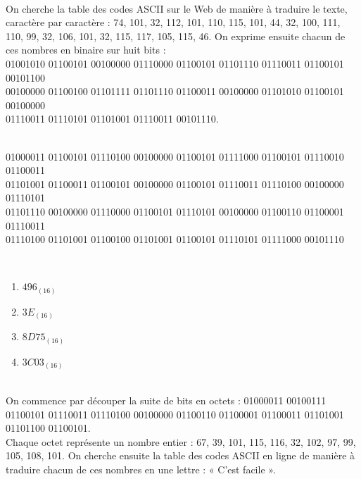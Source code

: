 \begin{Soln}{1}
		~\\
On cherche la table des codes ASCII sur le Web de manière à traduire le texte, caractère par
caractère : 74, 101, 32, 112, 101, 110, 115, 101, 44, 32, 100, 111, 110, 99, 32, 106, 101, 32,
115, 117, 105, 115, 46. On exprime ensuite chacun de ces nombres en binaire sur huit bits :\\
01001010 01100101 00100000 01110000 01100101 01101110 01110011 01100101 00101100\\
00100000 01100100 01101111 01101110 01100011 00100000 01101010 01100101 00100000\\
01110011 01110101 01101001 01110011 00101110.\\

	
\end{Soln}
\begin{Soln}{2}
	~\\ 01000011 01100101 01110100 00100000 01100101 01111000 01100101 01110010 01100011\\
	     01101001 01100011 01100101 00100000 01100101 01110011 01110100 00100000 01110101\\
	     01101110 00100000 01110000 01100101 01110101 00100000 01100110 01100001 01110011 \\
	     01110100 01101001 01100100 01101001 01100101 01110101 01111000 00101110
\end{Soln}
\begin{Soln}{3}
	~\\ \vspace{-7mm}
	\begin{multicols}{2}
		\begin{enumerate}
			\item $496_{(16)}$
			\item $3E_{(16)}$
			\item  $8D75_{(16)}$
			\item $3C03_{(16)}$
		\end{enumerate}
	\end{multicols}
\end{Soln}
\begin{Soln}{4}
	~\\
	On commence par découper la suite de bits en octets : 01000011 00100111 01100101
	01110011 01110100 00100000 01100110 01100001 01100011 01101001 01101100 01100101.\\
	Chaque octet représente un nombre entier : 67, 39, 101, 115, 116, 32, 102, 97, 99, 105, 108,
	101. On cherche ensuite la table des codes ASCII en ligne de manière à traduire chacun de
	ces nombres en une lettre : « C’est facile ».
\end{Soln}
